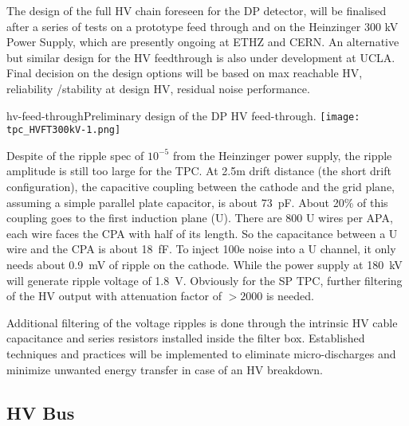 The design of the full HV chain foreseen for the DP detector, will be finalised  after a series of tests on a prototype feed through and on the Heinzinger 300 kV Power Supply, which are presently ongoing at ETHZ and CERN. An alternative but similar design for the HV feedthrough is also under development at UCLA. Final decision on the design options will be based on max reachable HV, reliability /stability at design HV, residual noise performance.


\begin{cdrfigure}{hv-feed-through}{Preliminary design of the DP HV feed-through.}
\texttt{[image: tpc\_HVFT300kV-1.png]}
\end{cdrfigure}



Despite of the ripple spec of $10^{-5}$ from the Heinzinger power supply, the ripple amplitude is still too large for the TPC.  At 2.5m drift distance (the short drift configuration), the capacitive coupling between the cathode and the grid plane, assuming a simple parallel plate capacitor, is about 73~pF.  About 20\% of this coupling goes to the first induction plane (U).  There are 800 U wires per APA, each wire faces the CPA with half of its length. So the capacitance between a U wire and the CPA is about 18~fF.  To inject 100e noise into a U channel, it only needs about 0.9~mV of ripple on the cathode.  While the power supply at 180~kV will generate ripple voltage of 1.8~V.  Obviously for the SP TPC, further filtering of the HV output with attenuation factor of $>2000$ is needed. 

Additional filtering of the voltage ripples is done
through the intrinsic HV cable capacitance and series resistors
installed inside the filter box. Established techniques and practices
will be implemented to eliminate micro-discharges and minimize
unwanted energy transfer in case of an HV breakdown.


\subsection{HV Bus}

